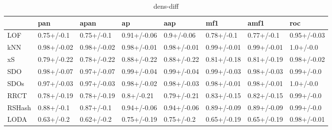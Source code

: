 \begin{table}
\centering
\caption{dens-diff}
\begin{tabular}{llllllll}
\toprule
{} &          pan &         apan &           ap &          aap &          mf1 &         amf1 &          roc \\
\midrule
LOF    &   0.75+/-0.1 &   0.75+/-0.1 &  0.91+/-0.06 &   0.9+/-0.06 &   0.78+/-0.1 &   0.77+/-0.1 &  0.95+/-0.03 \\
kNN    &  0.98+/-0.02 &  0.98+/-0.02 &  0.98+/-0.01 &  0.98+/-0.01 &  0.99+/-0.01 &  0.99+/-0.01 &    1.0+/-0.0 \\
xS     &  0.79+/-0.22 &  0.78+/-0.22 &  0.88+/-0.22 &  0.88+/-0.22 &  0.81+/-0.18 &  0.81+/-0.19 &  0.98+/-0.02 \\
SDO    &  0.98+/-0.07 &  0.97+/-0.07 &  0.99+/-0.04 &  0.99+/-0.04 &  0.99+/-0.03 &  0.98+/-0.03 &   0.99+/-0.0 \\
SDOs   &  0.97+/-0.03 &  0.97+/-0.03 &  0.98+/-0.02 &  0.98+/-0.03 &  0.98+/-0.01 &  0.98+/-0.01 &    1.0+/-0.0 \\
RRCT   &  0.78+/-0.19 &  0.78+/-0.19 &   0.8+/-0.21 &  0.79+/-0.21 &  0.83+/-0.15 &  0.82+/-0.15 &   0.99+/-0.0 \\
RSHash &   0.88+/-0.1 &   0.87+/-0.1 &  0.94+/-0.06 &  0.94+/-0.06 &  0.89+/-0.09 &  0.89+/-0.09 &   0.99+/-0.0 \\
LODA   &   0.63+/-0.2 &   0.62+/-0.2 &  0.75+/-0.19 &   0.75+/-0.2 &  0.65+/-0.19 &  0.65+/-0.19 &  0.98+/-0.01 \\
\bottomrule
\end{tabular}
\end{table}
